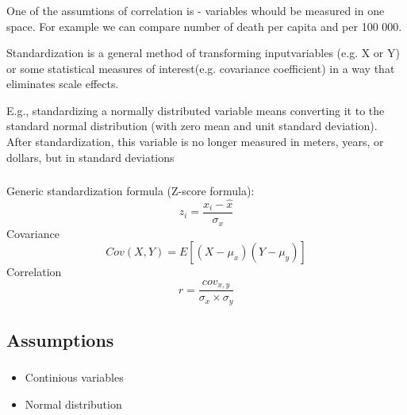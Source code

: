 \documentclass[t, 11pt]{beamer}
\begin{document}
				\begin{frame} 
		\frametitle{\insertsection} 	
	 One of the assumtions of correlation is  - variables whould be measured in one space. For example we can compare number of death per capita and per 100 000. 
	 
	 \vspace{0.5cm}
	 
	 Standardization is a general method of transforming inputvariables (e.g. X or Y) or some statistical measures of interest(e.g. covariance coefficient) in a way that eliminates scale effects.
	 	 
	 \vspace{0.5cm}
	 
	 E.g., standardizing a normally distributed variable means converting it to the standard normal distribution (with zero mean and unit standard deviation). After standardization, this variable is no longer measured in meters, years, or dollars, but in standard deviations
	 
	\end{frame}

				\begin{frame} 
	\frametitle{\insertsection} 	
		Generic standardization formula (Z-score formula):
		$$z_i = \frac{x_i- \hat{x}}{\sigma_x}$$
		Covariance
		$$Cov(X,Y) = E[(X-\mu_x)(Y-\mu_y)]$$
		Correlation
		$$r = \frac{cov_{x,y}}{\sigma_x \times \sigma_y}$$
	
\end{frame}
	
					\begin{frame} 
		\frametitle{\insertsection} 	

	\end{frame}
\subsection{Assumptions}


\begin{frame} 
	\frametitle{\insertsection} 	
	\framesubtitle{\insertsubsection} 	
	
	\begin{itemize}
		\item Continious variables
		\item Normal distribution
		\end{itemize}
	
\end{frame}
\end{document}
